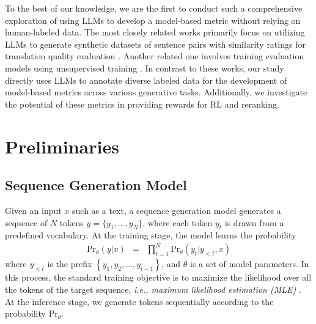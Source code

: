 \documentclass[lettersize,journal]{IEEEtran}
\begin{document}
To the best of our knowledge, we are the first to conduct such a comprehensive exploration of using LLMs to develop a model-based metric without relying on human-labeled data. The most closely related works primarily focus on utilizing LLMs to generate synthetic datasets of sentence pairs with similarity ratings for translation quality evaluation \cite{mohtashami2023learning}. Another related one involves training evaluation models using unsupervised training \cite{thompson2020automatic,fomicheva2020unsupervised}. In contrast to these works, our study directly uses LLMs to annotate diverse labeled data for the development of model-based metrics across various generative tasks. Additionally, we investigate the potential of these metrics in providing rewards for RL and reranking. 

\vspace{-2mm}
\section{Preliminaries}
\subsection{Sequence Generation Model}
Given an input $x$ such as a text, a sequence generation model generates a sequence of $N$ tokens $y = \{y_{1},\dots, y_{N}\}$, where each token $y_{t}$ is drawn from a predefined vocabulary.
At the training stage, the model learns the probability
\begin{eqnarray}
		\mathrm{Pr}_{\theta}(y|x) &=& \prod_{t=1}^{N}\mathrm{Pr}_{\theta}(y_{t}|y_{<t},x)
\label{eq-generation-pro}
\end{eqnarray}
where $y_{<t}$ is the prefix $\left\lbrace y_{1}, y_{2}, \dots, y_{t-1}\right\rbrace $, and $\theta$ is a set of model parameters.
In this process, the standard training objective is to maximize the likelihood over all the tokens of the target sequence, \textit{i.e., maximum likelihood estimation (MLE)} \cite{myung2003tutorial}.
At the inference stage, we generate tokens sequentially according to the probability $\mathrm{Pr}_{\theta}$.
\end{document}
